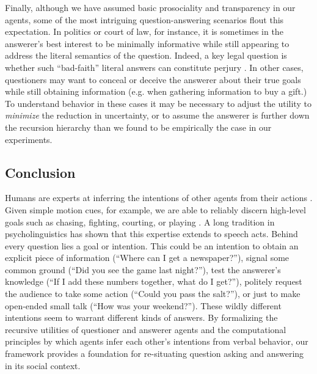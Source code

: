 \documentclass[11pt, floatsintext]{apa6}
\begin{document}
Finally, although we have assumed basic prosociality and transparency in our agents, some of the most intriguing question-answering scenarios flout this expectation. 
In politics or court of law, for instance, it is sometimes in the answerer's best interest to be minimally informative while still appearing to address the literal semantics of the question.
Indeed, a key legal question is whether such ``bad-faith'' literal answers can constitute perjury \cite{SolanTiersma05_SpeakingOfCrime}. 
In other cases, questioners may want to conceal or deceive the answerer about their true goals while still obtaining information (e.g. when gathering information to buy a gift.)
To understand behavior in these cases it may be necessary to adjust the utility to \emph{minimize} the reduction in uncertainty, or to assume the answerer is further down the recursion hierarchy than we found to be empirically the case in our experiments.


\subsection{Conclusion}
Humans are experts at inferring the intentions of other agents from their actions \cite{TomaselloCarpenter___Moll05_IntentionsCulturalCognition, BakerSaxeTenenbaum09_ActionUnderstandingInversePlanning}. Given simple motion cues, for example, we are able to reliably discern high-level goals such as chasing, fighting, courting, or playing \cite{BarrettToddMillerBlythe05_IntentionFromMotionCues, HeiderSimmel44_Animacy}. A long tradition in psycholinguistics has shown that this expertise extends to speech acts.  Behind every question lies a goal or intention. This could be an intention to obtain an explicit piece of information (``Where can I get a newspaper?''), signal some common ground (``Did you see the game last night?''), test the answerer's knowledge (``If I add these numbers together, what do I get?''), politely request the audience to take some action (``Could you pass the salt?''), or just to make open-ended small talk (``How was your weekend?''). These wildly different intentions seem to warrant different kinds of answers. %
By formalizing the recursive utilities of questioner and answerer agents and the computational principles by which agents infer each other's intentions from verbal behavior, our framework provides a foundation for re-situating question asking and answering in its social context.
\end{document}
